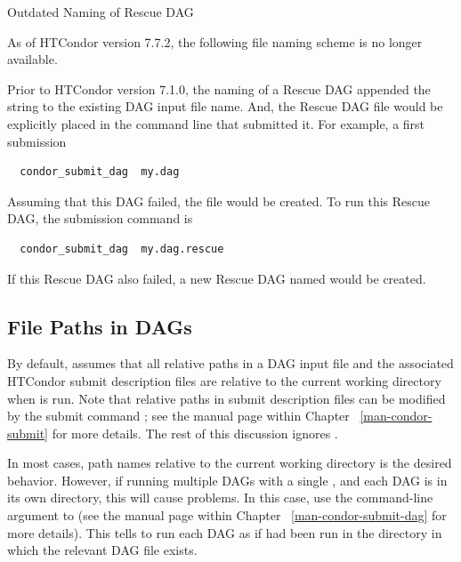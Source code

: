 \begin{description}
\item[Outdated Naming of Rescue DAG]
\end{description}
As of HTCondor version 7.7.2, the following file naming scheme is 
no longer available.

Prior to HTCondor version 7.1.0, the naming of a Rescue DAG
appended the string  to the existing DAG input
file name. 
And, the Rescue DAG file would be explicitly placed in 
the command line that submitted it.
For example,  a first submission
\begin{verbatim}
  condor_submit_dag  my.dag
\end{verbatim}
Assuming that this DAG failed, the file 
would be created.
To run this Rescue DAG, the submission command is
\begin{verbatim}
  condor_submit_dag  my.dag.rescue
\end{verbatim}
If this Rescue DAG also failed, a new Rescue DAG named
 would be created.

\subsection{\label{sec:DAGPaths}File Paths in DAGs}

By default,  assumes that all relative paths in a
DAG input file and the associated HTCondor submit description files
are relative to the current
working directory when  is run.  
Note that 
relative paths in submit description files can be modified by the submit command
; see the  manual page within Chapter
~\ref{man-condor-submit} for more details.  The rest of this discussion
ignores .

In most cases, path names relative to the current working directory 
is the desired behavior.
However, if running
multiple DAGs with a single , and each DAG is in its
own directory, this will cause problems.  In this case,
use the  command-line argument to
 (see the  manual page within Chapter
~\ref{man-condor-submit-dag} for more details).
This tells  to run each DAG
as if  had been run in the directory in which
the relevant DAG file exists.

